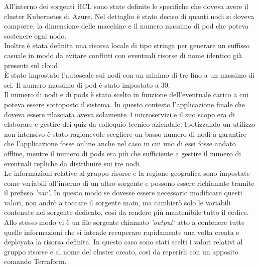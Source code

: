 \documentclass[a4paper,12pt]{report}
\begin{document}
All'interno dei sorgenti HCL sono state definite le specifiche che doveva avere il cluster Kubernetes di Azure. Nel dettaglio è stato deciso di quanti nodi si doveva comporre, la dimensione delle macchine e il numero massimo di pod che poteva sostenere ogni nodo. \\Inoltre è stata definita una risorsa locale di tipo stringa per generare un suffisso casuale in modo da evitare conflitti con eventuali risorse di nome identico già presenti sul cloud.\\
È stato impostato l'autoscale sui nodi con un minimo di tre fino a un massimo di sei. Il numero massimo di pod è stato impostato a 30.\\
Il numero di nodi e di pods è stato scelto in funzione dell'eventuale carico a cui poteva essere sottoposto il sistema. In questo contesto l'applicazione finale che doveva essere rilasciata aveva solamente 4 microservizi e il suo scopo era di elaborare e gestire dei quiz da colloquio tecnico aziendale. Ipotizzando un utilizzo non intensivo è stato ragionevole scegliere un basso numero di nodi a garantire che l'applicazione fosse online anche nel caso in cui uno di essi fosse andato offline, mentre il numero di pods era più che sufficiente a gestire il numero di eventuali repliche da distribuire sui tre nodi.\\
Le informazioni relative al gruppo risorse e la regione geografica sono impostate come variabili all'interno di un altro sorgente e possono essere richiamate tramite il prefisso \textit{'var'}. In questo modo se dovesse essere necessario modificare questi valori, non andrò a toccare il sorgente main, ma cambierò solo le variabili contenute nel sorgente dedicato, così da rendere più mantenibile tutto il codice.\\
Allo stesso modo vi è un file sorgente chiamato \textit{'output'} atto a contenere tutte quelle informazioni che si intende recuperare rapidamente una volta creata e deployata la risorsa definita. In questo caso sono stati scelti i valori relativi al gruppo risorse e al nome del cluster creato, così da reperirli con un apposito comando Terraform.\\ 
\end{document}
